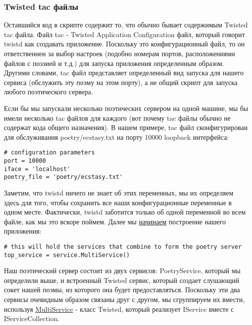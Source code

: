 \subsubsection{Twisted tac файлы}

Оставшийся код в скрипте содержит то, 
что обычно бывает содержимым Twisted tac файла. 
Файл tac - Twisted Application Configuration файл, который 
говорит twistd как создавать приложение. Поскольку это 
конфигурационный файл, то он ответственнен за выбор настроек (подобно 
номерам портов, расположениями файлов с поэзией и т.д.) для 
запуска приложения определенным образом. Другими словами, 
tac файл представляет определенный вид запуска для нашего сервиса (обслужить 
эту поэму на этом порту), а не общий скрипт для 
запуска любого поэтического сервера.


Если бы мы запускали несколько поэтических сервером на одной 
машине, мы бы имели несколько tac файлов для каждого (вот почему 
tac файлы обычно не содержат кода общего назначения). В нашем примере, 
tac файл сконфигурирован для обслуживания poetry/ecstasy.txt на 
порту 10000 loopback интерфейса:

 \begin{verbatim}
# configuration parameters
port = 10000
iface = 'localhost'
poetry_file = 'poetry/ecstasy.txt'
\end{verbatim} 


Заметим, что twistd ничего не знает об этих переменных, 
мы их определяем здесь для того, чтобы сохранить все наши 
конфигурационные переменные в одном месте. Фактически, twistd заботится 
только об одной переменной во всем файле, как мы это вскоре поймем. 
Далее мы \href{http://github.com/jdavisp3/twisted-intro/blob/master/twisted-server-3/fastpoetry.py#L44}{начинаем} построение нашего приложения:

 \begin{verbatim}
# this will hold the services that combine to form the poetry server
top_service = service.MultiService()
\end{verbatim} 


Наш поэтический сервер состоит из двух 
сервисов: PoetryService, который мы определили выше, и 
встроенный Twisted сервис, который создает слушающий сокет 
нашей поэмы, из которого она будет предоставляться. Поскольку 
эти два сервисы очевидным образом связаны друг с другом, 
мы сгруппируем их вмести, используя \href{http://twistedmatrix.com/trac/browser/tags/releases/twisted-10.0.0/twisted/application/service.py#L253}{MultiService} - класс Twisted, 
который реализует IService вместе с IServiceCollection.



